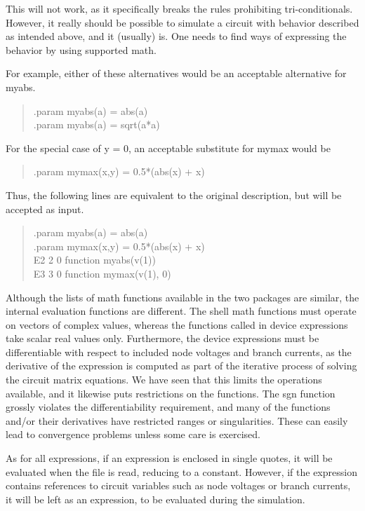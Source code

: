 This will not work, as it specifically breaks the rules prohibiting
tri-conditionals.  However, it really should be possible to simulate a
circuit with behavior described as intended above, and it (usually)
is.  One needs to find ways of expressing the behavior by using
supported math.

For example, either of these alternatives would be an acceptable
alternative for {\vt myabs}.
\begin{quote}\vt
.param myabs(a) = abs(a)\\
.param myabs(a) = sqrt(a*a)
\end{quote}
For the special case of {\vt y = 0}, an acceptable substitute
for {\vt mymax} would be
\begin{quote}\vt
.param mymax(x,y) = 0.5*(abs(x) + x)
\end{quote}

Thus, the following lines are equivalent to the original
description, but will be accepted as {\WRspice} input.
\begin{quote}\vt
.param myabs(a) = abs(a)\\
.param mymax(x,y) = 0.5*(abs(x) + x)\\
E2 2 0 function myabs(v(1))\\
E3 3 0 function mymax(v(1), 0)
\end{quote}

Although the lists of math functions available in the two packages are
similar, the internal evaluation functions are different.  The shell
math functions must operate on vectors of complex values, whereas the
functions called in device expressions take scalar real values only. 
Furthermore, the device expressions must be differentiable with
respect to included node voltages and branch currents, as the
derivative of the expression is computed as part of the iterative
process of solving the circuit matrix equations.  We have seen that
this limits the operations available, and it likewise puts
restrictions on the functions.  The {\vt sgn} function grossly
violates the differentiability requirement, and many of the functions
and/or their derivatives have restricted ranges or singularities. 
These can easily lead to convergence problems unless some care is
exercised.

As for all expressions, if an expression is enclosed in single quotes,
it will be evaluated when the file is read, reducing to a constant. 
However, if the expression contains references to circuit variables
such as node voltages or branch currents, it will be left as an
expression, to be evaluated during the simulation.

